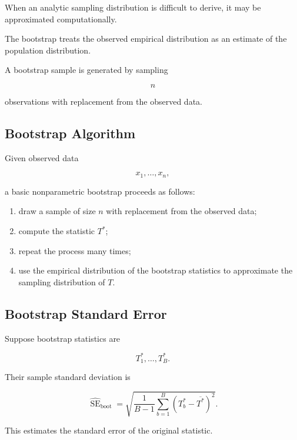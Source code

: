 When an analytic sampling distribution is difficult to derive, it may be
approximated computationally.

The bootstrap treats the observed empirical distribution as an estimate
of the population distribution.

A bootstrap sample is generated by sampling

\[
n
\]

observations with replacement from the observed data.

\subsection{Bootstrap Algorithm}
\label{subsec:bootstrap-algorithm}

Given observed data

\[
x_1,\ldots,x_n,
\]

a basic nonparametric bootstrap proceeds as follows:

\begin{enumerate}
    \item draw a sample of size \(n\) with replacement from the observed
          data;
    \item compute the statistic \(T^*\);
    \item repeat the process many times;
    \item use the empirical distribution of the bootstrap statistics to
          approximate the sampling distribution of \(T\).
\end{enumerate}

\subsection{Bootstrap Standard Error}
\label{subsec:bootstrap-standard-error}

Suppose bootstrap statistics are

\[
T_1^*,\ldots,T_B^*.
\]

Their sample standard deviation is

\[
\boxed{
\widehat{\operatorname{SE}}_{\text{boot}}
=
\sqrt{
\frac1{B-1}
\sum_{b=1}^{B}
(T_b^*-\overline{T^*})^2
}.
}
\]

This estimates the standard error of the original statistic.

